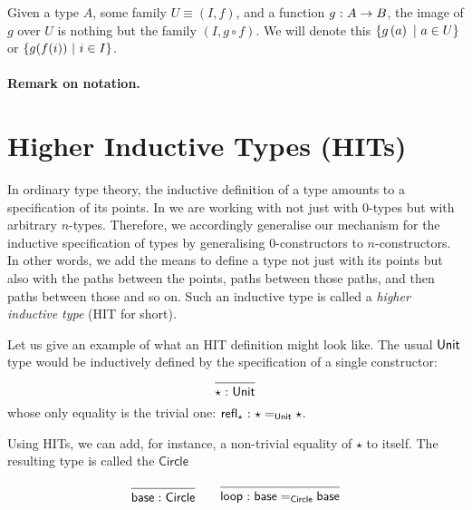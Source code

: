 \begin{defn}\label{defn:fam-img}
  Given a type $A$, some family $U \equiv (I, f)$, and a function $g\hspace{0.1mm}:\hspace{0.1mm}A \rightarrow B$, the
  image of $g$ over $U$ is nothing but the family $(I, g \circ f)$.
  We will denote this $\left\{  g\left( a \right) ~|~ a \in U  \right\}$ or $\left\{  g(f(i)) ~|~ i \in I  \right\}$.
\end{defn}

\paragraph*{Remark on \veragda{} notation.}

\section{Higher Inductive Types (HITs)}

In ordinary type theory, the inductive definition of a type amounts to a specification of
its points. In \UF{} we are working with not just with $0$-types but with arbitrary
$n$-types. Therefore, we accordingly generalise our mechanism for the inductive
specification of types by generalising $0$-constructors to $n$-constructors. In other
words, we add the means to define a type not just with its points but also with the paths
between the points, paths between those paths, and then paths between those and so on.
Such an inductive type is called a \emph{higher inductive type} (HIT for short).

Let us give an example of what an HIT definition might look like. The usual $\mathsf{Unit}{}$
type would be inductively defined by the specification of a single constructor:
\begin{equation*}
  \begin{prooftree}
    \infer0{\oftyI{\star}{\unitty{}}}
  \end{prooftree}
\end{equation*}
whose only equality is the trivial one: $\mathsf{refl}_\star\hspace{0.1mm}:\hspace{0.1mm}\star =_{\mathsf{Unit}{}} \star$.

Using HITs, we can add, for instance, a non-trivial equality of $\star$ to itself. The
resulting type is called the $\mathsf{Circle}$

\begin{equation*}
  \begin{prooftree}
    \infer0{\oftyI{\mathsf{base}}{\mathsf{Circle}}}
  \end{prooftree}
  \hspace{2em}
  \begin{prooftree}
    \infer0{\oftyI{\mathsf{loop}}{\mathsf{base} =_{\mathsf{Circle}} \mathsf{base}}}
  \end{prooftree}
\end{equation*}

